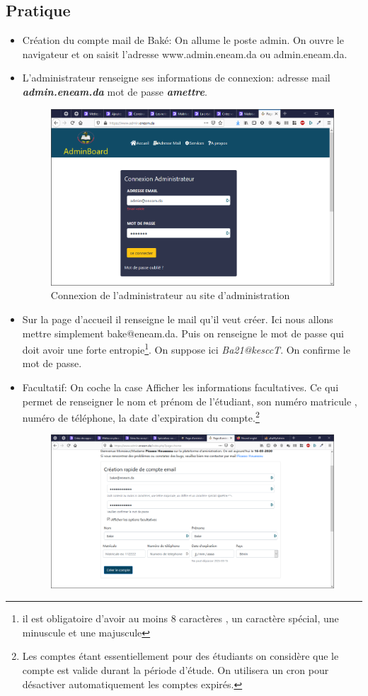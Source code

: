 \documentclass[a4paper,12pt,french]{report} %
\begin{document}
\subsection{Pratique}
\begin{itemize}
\item Création du compte mail de Baké: On allume le poste admin. On ouvre le navigateur et on saisit l'adresse www.admin.eneam.da ou admin.eneam.da.
\item L'administrateur renseigne ses informations de connexion: adresse mail \emph{\textbf{admin.eneam.da}} mot de passe \emph{\textbf{amettre}}.
\begin{figure}[H]
\centering
\includegraphics[scale=0.5]{figure/connexion_admin.png}
\caption{Connexion de l'administrateur au site d'administration}
\end{figure}
\item Sur la page d'accueil il renseigne le mail qu'il veut créer. Ici nous allons mettre simplement bake@eneam.da. Puis on renseigne le mot de passe qui doit avoir une forte entropie\footnote{il est obligatoire d'avoir au moins 8 caractères , un caractère spécial, une minuscule et une majuscule}. On suppose ici \emph{Ba21@kesccT}. On confirme le mot de passe.
\item Facultatif: On coche la case Afficher les informations facultatives. Ce qui permet de renseigner le nom et prénom de l'étudiant, son numéro matricule , numéro de téléphone, la date d'expiration du compte.\footnote{Les comptes étant essentiellement pour des étudiants on considère que le compte est valide durant la période d'étude. On utilisera un cron pour désactiver automatiquement les comptes expirés.}
\begin{figure}[H]
\centering
\includegraphics[width=483pt]{figure/creation_compte_bake.png} \\[1cm]

\end{figure}
\end{itemize}
\end{document}
